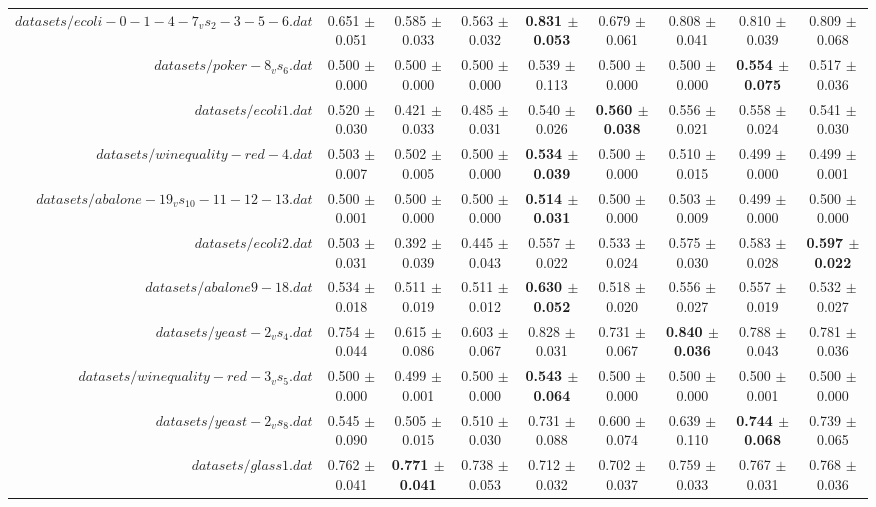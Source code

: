 \begin{table}[!ht]
{\begin{tabular}{r c c c c c c c c}
$datasets/ecoli-0-1-4-7_vs_2-3-5-6.dat$ & 0.651 $\pm$ 0.051 & 0.585 $\pm$ 0.033 & 0.563 $\pm$ 0.032 & \textbf{0.831 $\pm$ 0.053} & 0.679 $\pm$ 0.061 & 0.808 $\pm$ 0.041 & 0.810 $\pm$ 0.039 & 0.809 $\pm$ 0.068 \\
$datasets/poker-8_vs_6.dat$ & 0.500 $\pm$ 0.000 & 0.500 $\pm$ 0.000 & 0.500 $\pm$ 0.000 & 0.539 $\pm$ 0.113 & 0.500 $\pm$ 0.000 & 0.500 $\pm$ 0.000 & \textbf{0.554 $\pm$ 0.075} & 0.517 $\pm$ 0.036 \\
$datasets/ecoli1.dat$ & 0.520 $\pm$ 0.030 & 0.421 $\pm$ 0.033 & 0.485 $\pm$ 0.031 & 0.540 $\pm$ 0.026 & \textbf{0.560 $\pm$ 0.038} & 0.556 $\pm$ 0.021 & 0.558 $\pm$ 0.024 & 0.541 $\pm$ 0.030 \\
$datasets/winequality-red-4.dat$ & 0.503 $\pm$ 0.007 & 0.502 $\pm$ 0.005 & 0.500 $\pm$ 0.000 & \textbf{0.534 $\pm$ 0.039} & 0.500 $\pm$ 0.000 & 0.510 $\pm$ 0.015 & 0.499 $\pm$ 0.000 & 0.499 $\pm$ 0.001 \\
$datasets/abalone-19_vs_10-11-12-13.dat$ & 0.500 $\pm$ 0.001 & 0.500 $\pm$ 0.000 & 0.500 $\pm$ 0.000 & \textbf{0.514 $\pm$ 0.031} & 0.500 $\pm$ 0.000 & 0.503 $\pm$ 0.009 & 0.499 $\pm$ 0.000 & 0.500 $\pm$ 0.000 \\
$datasets/ecoli2.dat$ & 0.503 $\pm$ 0.031 & 0.392 $\pm$ 0.039 & 0.445 $\pm$ 0.043 & 0.557 $\pm$ 0.022 & 0.533 $\pm$ 0.024 & 0.575 $\pm$ 0.030 & 0.583 $\pm$ 0.028 & \textbf{0.597 $\pm$ 0.022} \\
$datasets/abalone9-18.dat$ & 0.534 $\pm$ 0.018 & 0.511 $\pm$ 0.019 & 0.511 $\pm$ 0.012 & \textbf{0.630 $\pm$ 0.052} & 0.518 $\pm$ 0.020 & 0.556 $\pm$ 0.027 & 0.557 $\pm$ 0.019 & 0.532 $\pm$ 0.027 \\
$datasets/yeast-2_vs_4.dat$ & 0.754 $\pm$ 0.044 & 0.615 $\pm$ 0.086 & 0.603 $\pm$ 0.067 & 0.828 $\pm$ 0.031 & 0.731 $\pm$ 0.067 & \textbf{0.840 $\pm$ 0.036} & 0.788 $\pm$ 0.043 & 0.781 $\pm$ 0.036 \\
$datasets/winequality-red-3_vs_5.dat$ & 0.500 $\pm$ 0.000 & 0.499 $\pm$ 0.001 & 0.500 $\pm$ 0.000 & \textbf{0.543 $\pm$ 0.064} & 0.500 $\pm$ 0.000 & 0.500 $\pm$ 0.000 & 0.500 $\pm$ 0.001 & 0.500 $\pm$ 0.000 \\
$datasets/yeast-2_vs_8.dat$ & 0.545 $\pm$ 0.090 & 0.505 $\pm$ 0.015 & 0.510 $\pm$ 0.030 & 0.731 $\pm$ 0.088 & 0.600 $\pm$ 0.074 & 0.639 $\pm$ 0.110 & \textbf{0.744 $\pm$ 0.068} & 0.739 $\pm$ 0.065 \\
$datasets/glass1.dat$ & 0.762 $\pm$ 0.041 & \textbf{0.771 $\pm$ 0.041} & 0.738 $\pm$ 0.053 & 0.712 $\pm$ 0.032 & 0.702 $\pm$ 0.037 & 0.759 $\pm$ 0.033 & 0.767 $\pm$ 0.031 & 0.768 $\pm$ 0.036 \\

\end{tabular}}
\end{table}
